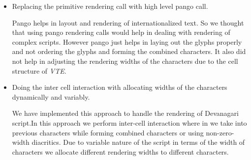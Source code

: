 \begin{itemize}
\item Replacing the primitive rendering call with high level pango call.

Pango helps in layout and rendering of internationalized text. So we thought that using pango rendering calls would help in dealing with rendering of complex scripts. However pango just helps in laying out the glyphs properly and not ordering the glyphs and forming the combined characters. It also did not help in adjusting the rendering widths of the characters due to the cell structure of \textit{VTE}.

\item Doing the inter cell interaction with allocating widths of the characters dynamically and variably.

We have implemented this approach to handle the rendering of Devanagari script.In this approach we perform inter-cell interaction where in we take into previous characters while forming combined characters or using non-zero-width diacritics. Due to variable nature of the script in terms of the width of characters we allocate different rendering widths to different characters.

\end{itemize}



